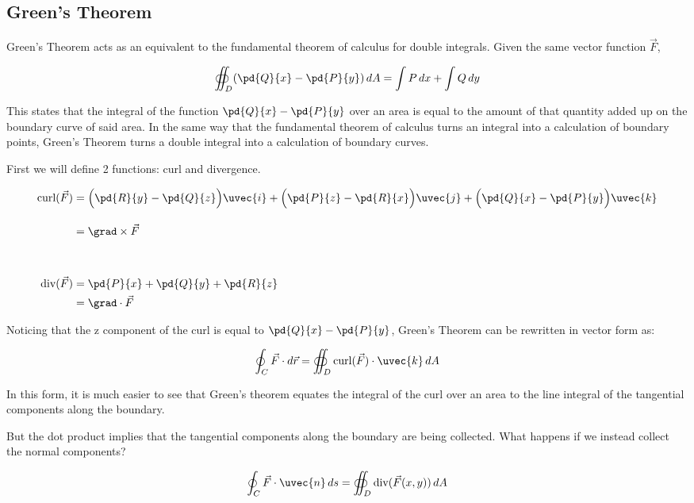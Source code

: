 \documentclass{notes}
\begin{document}
\subsection*{Green's Theorem}

Green's Theorem acts as an equivalent to the fundamental theorem of calculus for double integrals. Given the same vector function \(\vec{F}\), 

\begin{equation}
    \oiint_D (\pd{Q}{x} - \pd{P}{y})\,dA = \int P\,dx + \int Q\,dy
\end{equation}

This states that the integral of the function \(\pd{Q}{x} - \pd{P}{y}\) over an area is equal to the amount of that quantity added up on the boundary curve of said area. In the same way that the fundamental theorem of calculus turns an integral into a calculation of boundary points, Green's Theorem turns a double integral into a calculation of boundary curves.

First we will define 2 functions: curl and divergence.

\begin{align}
    \text{curl} (\vec{F}) &= \Big(\pd{R}{y} - \pd{Q}{z}\Big) \uvec{i} + \Big(\pd{P}{z} - \pd{R}{x}\Big) \uvec{j} + \Big(\pd{Q}{x} - \pd{P}{y}\Big) \uvec{k}\\[10pt]
     &= \grad \times \vec{F}\\[30pt]
    \text{div} (\vec{F}) &= \pd{P}{x} + \pd{Q}{y} + \pd{R}{z}\\
    &= \grad \cdot \vec{F}
\end{align}

Noticing that the z component of the curl is equal to \(\pd{Q}{x} - \pd{P}{y}\), Green's Theorem can be rewritten in vector form as:

\begin{gather}
    \oint_C \vec{F}\cdot d\vec{r} = \oiint_D \text{curl} (\vec{F}) \cdot \uvec{k}\, dA
\end{gather}

In this form, it is much easier to see that Green's theorem equates the integral of the curl over an area to the line integral of the tangential components along the boundary.

But the dot product implies that the tangential components along the boundary are being collected. What happens if we instead collect the normal components?

\begin{gather}
    \oint_C \vec{F} \cdot \uvec{n} \, ds = \oiint_D \text{div}(\vec{F}(x, y))\, dA
\end{gather}
\end{document}
